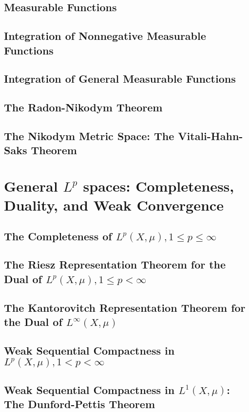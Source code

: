 \documentclass[a4paper,10pt]{book}
\theoremstyle{plain} %
\begin{document}
\section{Measurable Functions}
\section{Integration of Nonnegative Measurable Functions}
\section{Integration of General Measurable Functions}
\section{The Radon-Nikodym Theorem}
\section{The Nikodym Metric Space: The Vitali-Hahn-Saks Theorem}

\chapter{General $L^p$ spaces: Completeness, Duality, and Weak Convergence}

\section{The Completeness of $L^p(X,\mu),1\le p \le \infty$}
\section{The Riesz Representation Theorem for the Dual of $L^p(X,\mu),1\le p < \infty$}
\section{The Kantorovitch Representation Theorem for the Dual of $L^\infty(X,\mu)$}
\section{Weak Sequential Compactness in $L^p(X,\mu),1< p < \infty$}
\section{Weak Sequential Compactness in $L^1(X,\mu)$: The Dunford-Pettis Theorem}

\end{document}
